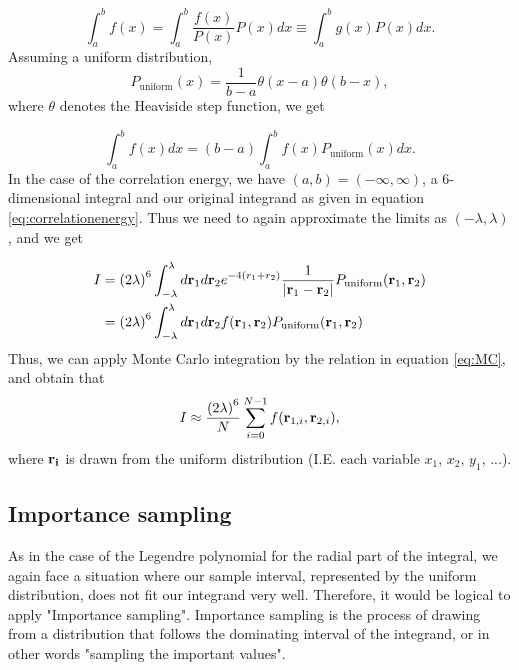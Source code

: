\documentclass{emulateapj}
\begin{document}
\begin{equation}
    \int_a^b f\left(x\right) = \int_a^b \frac{f\left(x\right)}{P\left(x\right)}P\left(x\right) dx \equiv \int_a^b g\left(x\right) P\left(x\right) dx.
\end{equation}
Assuming a uniform distribution,
\begin{equation}
    P_\text{uniform}(x) = \frac{1}{b-a}\theta\left(x-a\right)\theta\left(b-x\right),
\end{equation}
where $\theta$ denotes the Heaviside step function, we get

\begin{equation}
    \int_a^b f(x) dx = \left(b-a\right) \int_a^b f(x) P_\text{uniform}(x) dx.
\end{equation}
In the case of the correlation energy, we have $(a,b) = (-\infty,\infty)$, a 6-dimensional integral and our original integrand as given in equation \ref{eq:correlationenergy}. Thus we need to again approximate the limits as $(-\lambda,\lambda)$, and we get

\begin{align*}
    I &= \left(2\lambda\right)^6 \int_{-\lambda}^{\lambda} d{\bf r}_1d{\bf r}_2  e^{-4 (r_1+r_2)}\frac{1}{|{\bf r}_1-{\bf r}_2|} P_\text{uniform}({\bf r}_1, {\bf r}_2) \\
    &= \left(2\lambda\right)^6 \int_{-\lambda}^{\lambda} d{\bf r}_1d{\bf r}_2 f({\bf r}_1, {\bf r}_2) P_\text{uniform}({\bf r}_1, {\bf r}_2)
\end{align*}
Thus, we can apply Monte Carlo integration by the relation in equation \ref{eq:MC}, and obtain that
\begin{equation}
    I \approx \frac{\left(2\lambda\right)^6}{N}\sum_{i=0}^{N-1} f({\bf r}_{1,i}, {\bf r}_{2,i}),
\end{equation}
where $\bf r_i$ is drawn from the uniform distribution (I.E. each variable $x_1$, $x_2$, $y_1$, ...).

\subsection{Importance sampling}
As in the case of the Legendre polynomial for the radial part of the integral, we again face a situation where our sample interval, represented by the uniform distribution, does not fit our integrand very well. Therefore, it would be logical to apply "Importance sampling". Importance sampling is the process of drawing from a distribution that follows the dominating interval of the integrand, or in other words "sampling the important values".
\end{document}
